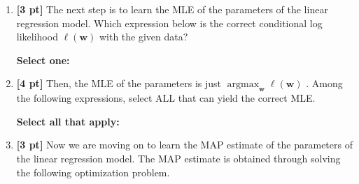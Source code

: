 \documentclass{article}
\newcommand{\blackcircle}{\tikz\draw[black,fill=black] (0,0) circle (1ex);}
\renewcommand{\circle}{\tikz\draw[black] (0,0) circle (1ex);}
\newcommand{\argmax}{\mathop{\mathrm{argmax}}}
\begin{document}
\begin{enumerate}
    \item \textbf{[3 pt]} The next step is to learn the MLE of the parameters of the linear regression model. Which expression below is the correct conditional log likelihood $\ell(\mathbf{w})$ with the given data?

    \textbf{Select one:}
    
    \item \textbf{[4 pt]} Then, the MLE of the parameters is just  $\argmax_{\mathbf{w}} \ell(\mathbf{w})$ . Among the following expressions, select ALL that can yield the correct MLE. 

    \textbf{Select all that apply:}
    
    \item \textbf{[3 pt]} Now we are moving on to learn the MAP estimate of the parameters of the linear regression model. The MAP estimate is obtained through solving the following optimization problem.


\end{enumerate}
\end{document}
